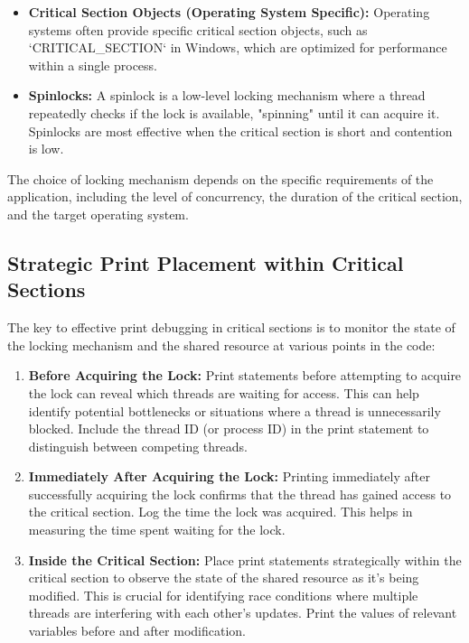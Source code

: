 \documentclass{article}
\begin{document}
{{{\begin{itemize}
    \item \textbf{Critical Section Objects (Operating System Specific):}  Operating systems often provide specific critical section objects, such as `CRITICAL_SECTION` in Windows, which are optimized for performance within a single process.

    \item \textbf{Spinlocks:} A spinlock is a low-level locking mechanism where a thread repeatedly checks if the lock is available, "spinning" until it can acquire it. Spinlocks are most effective when the critical section is short and contention is low.
\end{itemize}

The choice of locking mechanism depends on the specific requirements of the application, including the level of concurrency, the duration of the critical section, and the target operating system.

\subsection*{Strategic Print Placement within Critical Sections}

The key to effective print debugging in critical sections is to monitor the state of the locking mechanism and the shared resource at various points in the code:

\begin{enumerate}
    \item \textbf{Before Acquiring the Lock:} Print statements before attempting to acquire the lock can reveal which threads are waiting for access. This can help identify potential bottlenecks or situations where a thread is unnecessarily blocked.  Include the thread ID (or process ID) in the print statement to distinguish between competing threads.

    \item \textbf{Immediately After Acquiring the Lock:}  Printing immediately after successfully acquiring the lock confirms that the thread has gained access to the critical section.  Log the time the lock was acquired.  This helps in measuring the time spent waiting for the lock.

    \item \textbf{Inside the Critical Section:} Place print statements strategically within the critical section to observe the state of the shared resource as it's being modified. This is crucial for identifying race conditions where multiple threads are interfering with each other's updates.  Print the values of relevant variables before and after modification.


\end{enumerate}}}}
\end{document}
